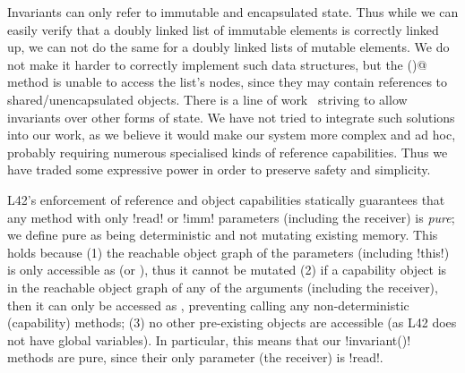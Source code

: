 Invariants can only refer to immutable and encapsulated state. Thus while we can easily verify that a doubly linked list of immutable elements
is correctly linked up,
we can not do the same for a doubly linked lists of mutable elements. We do not make it harder to correctly implement such data structures, 
but the \Q@invariant()@ method is unable to access the list's nodes, since they may contain \Q@mut@ references to shared/unencapsulated objects.
There is a line of work~\cite{DBLP:conf/mpc/BarnettN04} striving to allow invariants over other forms of state.
We have not tried to integrate such solutions into our work, as we believe it would make our system more complex and ad hoc, probably requiring numerous specialised kinds of reference capabilities.
Thus we have traded some expressive power in order to preserve safety and simplicity.

\label{s:purity}
L42's enforcement of reference and object capabilities statically guarantees that any method with only \Q!read! or \Q!imm! parameters (including the receiver) is \emph{pure}; we define pure
as being deterministic and not mutating existing memory. This holds because
(1) the reachable object graph of the parameters (including \Q!this!) is only accessible as \Q@read@ (or \Q@imm@), thus it cannot be mutated
(2) if a capability object is in the reachable object graph of any of the arguments (including the receiver), then it can only be accessed as \Q@read@, preventing calling any 
non-deterministic (capability) methods;
(3) no other pre-existing objects are accessible (as L42 does not have global variables). 
In particular, this means that our \Q!invariant()! methods are pure, since 
their only parameter (the receiver) is \Q!read!.

